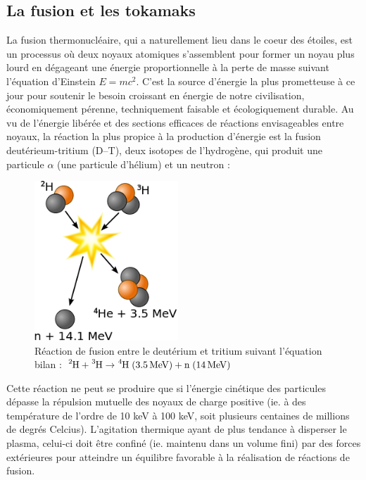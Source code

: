 \label{Annexe A}
\begin{refsection}

\section*{La fusion et les tokamaks}

La fusion thermonucléaire, qui a naturellement lieu dans le coeur des étoiles,
est un processus où deux noyaux atomiques s'assemblent pour former un noyau
plus lourd en dégageant une énergie proportionnelle à la perte de masse suivant
l'équation d'Einstein $E=mc^2$. C'est la source d'énergie la plus prometteuse
à ce jour pour soutenir le besoin croissant en énergie de notre civilisation,
économiquement pérenne, techniquement faisable et écologiquement durable.
Au vu de l'énergie libérée et des sections efficaces de réactions envisageables
entre noyaux, la réaction la plus propice à la production d'énergie est la
fusion deutérieum-tritium (D--T), deux isotopes de l'hydrogène, qui produit une
particule $\alpha$ (une particule d'hélium) et un neutron :
\begin{figure}[!htbp]
    \centering
	\includegraphics[height=60mm]{figures/1-fusion.png}
	\caption{Réaction
de fusion entre le deutérium et tritium suivant l'équation
bilan : $\ce{^2\text{H}}+\ce{^3\text{H}} \rightarrow
\ce{^4\text{H}}\;(3.5\,\text{MeV})+\text{n}\;(14\,\text{MeV})$}\label{fusionDT}
\end{figure}

Cette réaction ne peut se produire que si l'énergie cinétique des particules
dépasse la répulsion mutuelle des noyaux de charge positive (ie. à des
température de l'ordre de 10 keV à 100 keV, soit plusieurs centaines de
millions de degrés Celcius). L'agitation thermique ayant de plus tendance à
disperser le plasma, celui-ci doit être confiné (ie. maintenu dans un volume
fini) par des forces extérieures pour atteindre un équilibre favorable à la
réalisation de réactions de fusion.


\end{refsection}
